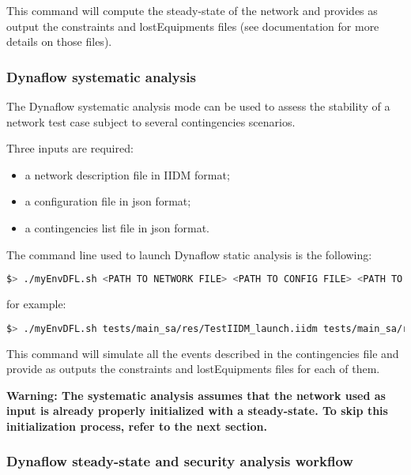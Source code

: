 \documentclass[a4paper, 12pt]{report}
\begin{document}
This command will compute the steady-state of the network and provides as
output the constraints and lostEquipments files (see \Dynawo documentation for more details on those files).

\subsubsection{Dynaflow systematic analysis}

The Dynaflow systematic analysis mode can be used to assess the stability of a network test case subject to several contingencies scenarios.

Three inputs are required:
\begin{itemize}
  \item a network description file in IIDM format;
  \item a configuration file in json format;
  \item a contingencies list file in json format.
\end{itemize}

The command line used to launch Dynaflow static analysis is the following:

\begin{lstlisting}[language=bash, breaklines=true, breakatwhitespace=false, columns=fullflexible]
$> ./myEnvDFL.sh <PATH TO NETWORK FILE> <PATH TO CONFIG FILE> <PATH TO CONTINGENCIES FILE>
\end{lstlisting}

for example:

\begin{lstlisting}[language=bash, breaklines=true, breakatwhitespace=false, columns=fullflexible]
$> ./myEnvDFL.sh tests/main_sa/res/TestIIDM_launch.iidm tests/main_sa/res/config_launch.json tests/main_sa/res/contingencies_launch.json
\end{lstlisting}

This command will simulate all the events described in the contingencies file and provide as outputs the constraints and lostEquipments files for each of them.

\textbf{Warning: The systematic analysis assumes that the network used as input is already properly initialized with a steady-state. To skip this initialization process, refer to the next section.}

\subsubsection{Dynaflow steady-state and security analysis workflow}
\end{document}
